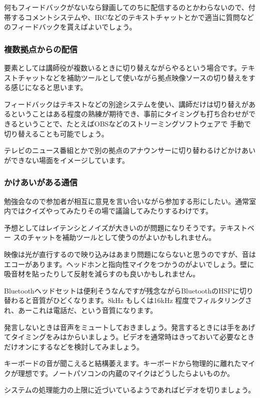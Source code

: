 \documentclass[mingoth,a4paper]{jsarticle}
\begin{document}
何もフィードバックがないなら録画してのちに配信するのとかわらないので、付
帯するコメントシステムや、IRCなどのテキストチャットとかで適当に質問など
のフィードバックを貰えばよいでしょう。

\subsubsection{複数拠点からの配信}

要素としては講師役が複数いるときに切り替えながらやるという場合です。テキ
ストチャットなどを補助ツールとして使いながら拠点映像ソースの切り替えをす
る感じになると思います。

フィードバックはテキストなどの別途システムを使い、講師だけは切り替えがあ
るということはある程度の熟練が期待でき、事前にタイミングも打ち合わせがで
きるということで、たとえばOBSなどのストリーミングソフトウェアで
手動で切り替えることも可能でしょう。

テレビのニュース番組とかで別の拠点のアナウンサーに切り替わるけどかけあい
ができない場面をイメージしています。

\subsubsection{かけあいがある通信}

勉強会なので参加者が相互に意見を言い合いながら参加する形にしたい。通常室
内ではクイズやってみたりその場で議論してみたりするわけです。

予想としてはレイテンシとノイズが大きいのが問題になりそうです。テキストベー
スのチャットを補助ツールとして使うのがよいかもしれません。

映像は光が直行するので映り込みはあまり問題にならないと思うのですが、音は
エコーがあります。ヘッドホンと指向性マイクをつかうのがよいでしょう。壁に
吸音材を貼ったりして反射を減らすのも良いかもしれません。

Bluetoothヘッドセットは便利そうなんですが残念ながらBluetoothのHSPに切り
替わると音質がひどくなります。8kHz もしくは16kHz 程度でフィルタリングさ
れ、あーこれは電話だ、という音質になります。

発言しないときは音声をミュートしておきましょう。発言するときには手をあげ
てタイミングをみはからいましょう。ビデオを通常時はきっておいて必要なとき
だけオンにするなどを検討してみましょう。

キーボードの音が聞こえると結構萎えます。キーボードから物理的に離れたマイ
クが理想です。ノートパソコンの内蔵のマイクはどうしたらよいものか。

システムの処理能力の上限に近づいているようであればビデオを切りましょう。
\end{document}
